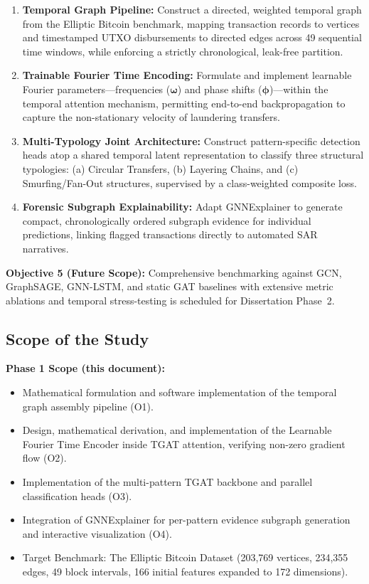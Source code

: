\begin{enumerate}
	\item[\textbf{O1}] \textbf{Temporal Graph Pipeline:} Construct a directed, weighted temporal graph from the Elliptic Bitcoin benchmark, mapping transaction records to vertices and timestamped UTXO disbursements to directed edges across 49 sequential time windows, while enforcing a strictly chronological, leak-free partition.

	\item[\textbf{O2}] \textbf{Trainable Fourier Time Encoding:} Formulate and implement learnable Fourier parameters—frequencies ($\boldsymbol{\omega}$) and phase shifts ($\boldsymbol{\phi}$)—within the temporal attention mechanism, permitting end-to-end backpropagation to capture the non-stationary velocity of laundering transfers.

	\item[\textbf{O3}] \textbf{Multi-Typology Joint Architecture:} Construct pattern-specific detection heads atop a shared temporal latent representation to classify three structural typologies: (a) Circular Transfers, (b) Layering Chains, and (c) Smurfing/Fan-Out structures, supervised by a class-weighted composite loss.

	\item[\textbf{O4}] \textbf{Forensic Subgraph Explainability:} Adapt GNNExplainer to generate compact, chronologically ordered subgraph evidence for individual predictions, linking flagged transactions directly to automated SAR narratives.
\end{enumerate}

\noindent \textbf{Objective 5 (Future Scope):} Comprehensive benchmarking against GCN, GraphSAGE, GNN-LSTM, and static GAT baselines with extensive metric ablations and temporal stress-testing is scheduled for Dissertation Phase~2.

\subsection{Scope of the Study}
\label{subsec:scope}

\textbf{Phase 1 Scope (this document):}
\begin{itemize}
	\item Mathematical formulation and software implementation of the temporal graph assembly pipeline (O1).
	\item Design, mathematical derivation, and implementation of the Learnable Fourier Time Encoder inside TGAT attention, verifying non-zero gradient flow (O2).
	\item Implementation of the multi-pattern TGAT backbone and parallel classification heads (O3).
	\item Integration of GNNExplainer for per-pattern evidence subgraph generation and interactive visualization (O4).
	\item Target Benchmark: The Elliptic Bitcoin Dataset (203,769 vertices, 234,355 edges, 49 block intervals, 166 initial features expanded to 172 dimensions).
\end{itemize}

